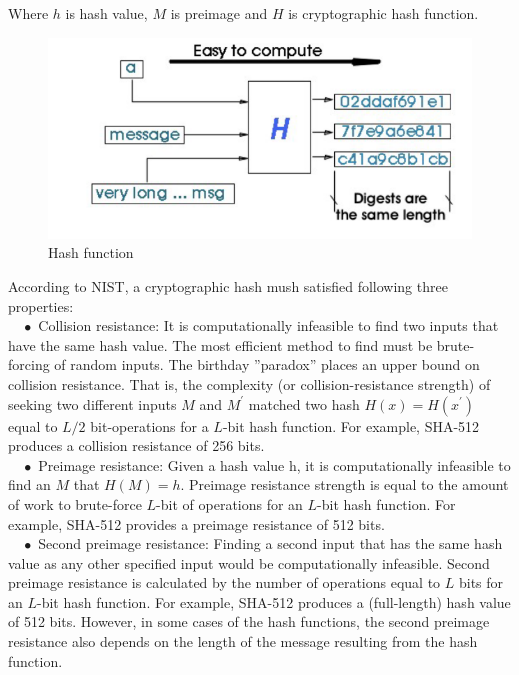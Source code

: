 Where $h$ is hash value, $M$ is preimage and $H$ is cryptographic hash function.\\
\vspace{0.2cm}
\begin{figure}[ht!]
  \centering
  \includegraphics[width=1\textwidth]{images/hash_function.png}
  \caption[Hash function]{Hash function}
  \label{fig:hash_function}
\end{figure}

According to NIST, a cryptographic hash mush satisfied following three properties:\\

$\quad\bullet$ Collision resistance: It is computationally infeasible to find two inputs that have the same hash value. The most efficient method to find must be brute-forcing of random inputs. The birthday ”paradox” places an upper bound on collision resistance. That is, the complexity (or collision-resistance strength) of seeking two different inputs $M$ and $M^{\prime}$ matched two hash $H(x) = H(x^{\prime})$ equal to $L/2$ bit-operations for a $L$-bit hash function. For example, SHA-512 produces a collision resistance of 256 bits.\\

$\quad\bullet$ Preimage resistance: Given a hash value h, it is computationally infeasible to find an $M$ that $H(M)=h$. Preimage resistance strength is equal to the amount of work to brute-force $L$-bit of operations for an $L$-bit hash function. For example, SHA-512 provides a preimage resistance of 512 bits.\\

$\quad\bullet$ Second preimage resistance: Finding a second input that has the same hash value as any other specified input would be computationally infeasible. Second preimage resistance is calculated by the number of operations equal to $L$ bits for an $L$-bit hash function. For example, SHA-512 produces a (full-length) hash value of 512 bits. However, in some cases of the hash functions, the second preimage resistance also depends on the length of the message resulting from the hash function.\\

